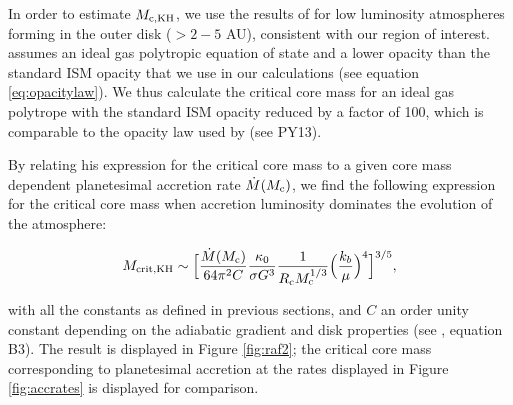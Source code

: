 \documentclass[apj]{emulateapj}
\newcommand{\co}{_{\rm c}}
\begin{document}




In order to estimate $M_{\rm c, KH}$, we use the results of \citet{rafikov06} for low luminosity atmospheres forming in the outer disk ($>2-5$ AU), consistent with our region of interest. \citet{rafikov06} assumes an ideal gas polytropic equation of state and a lower opacity than the standard ISM opacity that we use in our calculations (see equation \ref{eq:opacitylaw}). We thus calculate the critical core mass for an ideal gas polytrope with the standard ISM opacity reduced by a factor of 100, which is comparable to the opacity law used by \citet{rafikov06} (see PY13). 

By relating his expression for the critical core mass to a given core mass dependent planetesimal accretion rate $\dot{M}(M_{\rm{c}})$, we find the following expression for the critical core mass when accretion luminosity dominates the evolution of the atmosphere:

\begin{equation}
\label{eq:critraf}
M_{\rm{crit, KH}} \sim \Big[\frac{\dot{M}(M_{\rm{c}})}{64 \pi^2 C} \frac{\kappa_0}{\sigma G^3} \frac{1}{R\co M\co^{1/3}} \Big(\frac{k_b}{\mu}\Big)^4\Big]^{3/5},
\end{equation}

\noindent with all the constants as defined in previous sections, and $C$ an order unity constant depending on the adiabatic gradient and disk properties (see \citealt{rafikov06}, equation B3). The result is displayed in Figure \ref{fig:raf2}; the critical core mass corresponding to planetesimal accretion at the rates displayed in Figure \ref{fig:accrates} is displayed for comparison.  
\end{document}
